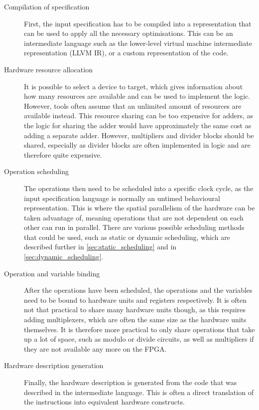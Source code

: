 \begin{description}
\item[Compilation of specification] First, the input specification has to
  be compiled into a representation that can be used to apply all the necessary
  optimisations.  This can be an intermediate language such as the lower-level
  virtual machine intermediate representation (LLVM IR), or a custom
  representation of the code.

  \item[Hardware resource allocation] It is possible to select a device to
  target, which gives information about how many resources are available and can
  be used to implement the logic.  However, tools often assume that an unlimited
  amount of resources are available instead.  This resource sharing can be too
  expensive for adders, as the logic for sharing the adder would have
  approximately the same cost as adding a separate adder.  However, multipliers
  and divider blocks should be shared, especially as divider blocks are often
  implemented in logic and are therefore quite expensive.

  \item[Operation scheduling] The operations then need to be scheduled into a
  specific clock cycle, as the input specification language is normally an
  untimed behavioural representation.  This is where the spatial parallelism of
  the hardware can be taken advantage of, meaning operations that are not
  dependent on each other can run in parallel.  There are various possible
  scheduling methods that could be used, such as static or dynamic scheduling,
  which are described further in \cref{sec:static_scheduling} and in
  \cref{sec:dynamic_scheduling}.

  \item[Operation and variable binding] After the operations have been
  scheduled, the operations and the variables need to be bound to hardware units
  and registers respectively.  It is often not that practical to share many
  hardware units though, as this requires adding multiplexers, which are often
  the same size as the hardware units themselves.  It is therefore more
  practical to only share operations that take up a lot of space, such as modulo
  or divide circuits, as well as multipliers if they are not available any more
  on the FPGA.

  \item[Hardware description generation] Finally, the hardware description is
  generated from the code that was described in the intermediate language.  This
  is often a direct translation of the instructions into equivalent hardware
  constructs.
\end{description}

